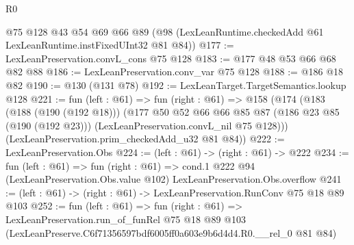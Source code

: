 \begin{lexlean}{R0}
\begin{coremodule}
    @75
    @128
    @43
    @54
    @69
    @66
    @89
    (@98 (LexLeanRuntime.checkedAdd @61 LexLeanRuntime.instFixedUInt32 @81 @84))
@177 := LexLeanPreservation.convL_cons @75 @128
@183 := @177 @48 @53 @66 @68 @82 @88
@186 := LexLeanPreservation.conv_var @75 @128
@188 := @186 @18 @82
@190 := @130 (@131 @78)
@192 := LexLeanTarget.TargetSemantics.lookup @128
@221 := fun (left : @61) =>
  fun (right : @61) =>
  @158
    (@174
      (@183
        (@188 (@190 (@192 @18)))
        (@177
          @50
          @52
          @66
          @66
          @85
          @87
          (@186 @23 @85 (@190 (@192 @23)))
          (LexLeanPreservation.convL_nil @75 @128)))
      (LexLeanPreservation.prim_checkedAdd_u32 @81 @84))
@222 := LexLeanPreservation.Obs
@224 := (left : @61) -> (right : @61) -> @222
@234 := fun (left : @61) =>
  fun (right : @61) =>
  cond.{1} @222 @94 (LexLeanPreservation.Obs.value @102) LexLeanPreservation.Obs.overflow
@241 := (left : @61) -> (right : @61) -> LexLeanPreservation.RunConv @75 @18 @89 @103
@252 := fun (left : @61) =>
  fun (right : @61) =>
  LexLeanPreservation.run_of_funRel
    @75
    @18
    @89
    @103
    (LexLeanPreserve.C6f71356597bdf6005ff0a603e9b6d4d4.R0.__rel_0 @81 @84)
\end{coremodule}
\end{lexlean}
